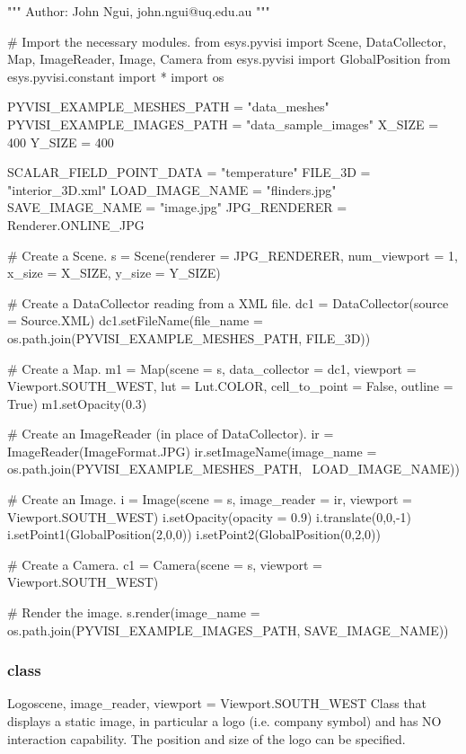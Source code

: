 \begin{python}
"""
Author: John Ngui, john.ngui@uq.edu.au
"""

# Import the necessary modules.
from esys.pyvisi import Scene, DataCollector, Map, ImageReader, Image, Camera
from esys.pyvisi import GlobalPosition
from esys.pyvisi.constant import *
import os

PYVISI_EXAMPLE_MESHES_PATH = "data_meshes"
PYVISI_EXAMPLE_IMAGES_PATH = "data_sample_images"
X_SIZE = 400
Y_SIZE = 400

SCALAR_FIELD_POINT_DATA = "temperature"
FILE_3D = "interior_3D.xml"
LOAD_IMAGE_NAME = "flinders.jpg"
SAVE_IMAGE_NAME = "image.jpg"
JPG_RENDERER = Renderer.ONLINE_JPG

# Create a Scene.
s = Scene(renderer = JPG_RENDERER, num_viewport = 1, x_size = X_SIZE, 
        y_size = Y_SIZE)

# Create a DataCollector reading from a XML file.
dc1 = DataCollector(source = Source.XML)
dc1.setFileName(file_name = os.path.join(PYVISI_EXAMPLE_MESHES_PATH, FILE_3D))

# Create a Map.
m1 = Map(scene = s, data_collector = dc1, viewport = Viewport.SOUTH_WEST,
        lut = Lut.COLOR, cell_to_point = False, outline = True)
m1.setOpacity(0.3)

# Create an ImageReader (in place of DataCollector).
ir = ImageReader(ImageFormat.JPG)
ir.setImageName(image_name =  os.path.join(PYVISI_EXAMPLE_MESHES_PATH, \
        LOAD_IMAGE_NAME))

# Create an Image.
i = Image(scene = s, image_reader = ir, viewport = Viewport.SOUTH_WEST)
i.setOpacity(opacity = 0.9)
i.translate(0,0,-1)
i.setPoint1(GlobalPosition(2,0,0))
i.setPoint2(GlobalPosition(0,2,0))

# Create a Camera. 
c1 = Camera(scene = s, viewport = Viewport.SOUTH_WEST)

# Render the image.
s.render(image_name = os.path.join(PYVISI_EXAMPLE_IMAGES_PATH, SAVE_IMAGE_NAME))
\end{python}

\subsubsection{\Logo class}

\begin{classdesc}{Logo}{scene, image_reader, viewport = Viewport.SOUTH_WEST}
Class that displays a static image, in particular a logo
(i.e. company symbol) and has NO interaction capability. The position and size
of the logo can be specified.
\end{classdesc}

